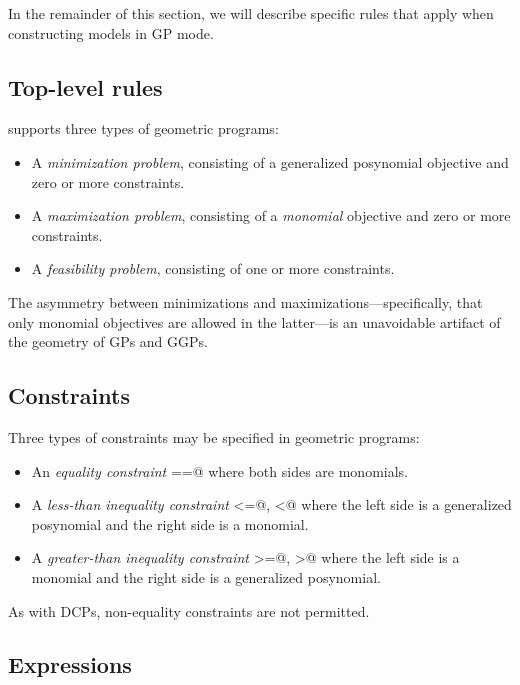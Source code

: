 \documentclass[12pt]{article}
\begin{document}
In the remainder of this section, we will describe specific rules
that apply when constructing models in GP mode.

\subsection{Top-level rules}

\cvx supports three types of geometric programs:
\begin{itemize}
\item A \emph{minimization problem}, consisting of a generalized posynomial objective and
zero or more constraints.
\item A \emph{maximization problem}, consisting of a \emph{monomial} objective and
zero or more constraints.
\item A \emph{feasibility problem}, consisting of one or more constraints.
\end{itemize}
The asymmetry between minimizations and maximizations---specifically, that only monomial
objectives are allowed in the latter---is an unavoidable artifact of
the geometry of GPs and GGPs.

\subsection{Constraints}

Three types of constraints may be specified in geometric programs:
\begin{itemize}
\item An \emph{equality constraint} \verb@==@ where both sides are monomials.
\item A \emph{less-than inequality constraint} \verb@<=@, \verb@<@ 
where the left side is a generalized posynomial and the right side is a monomial.
\item A \emph{greater-than inequality constraint} \verb@>=@, \verb@>@ 
where the left side is a monomial and the right side is a generalized posynomial.
\end{itemize}
As with DCPs, non-equality constraints are not permitted.

\subsection{Expressions}
\label{sec:gp-expressions}
\end{document}
